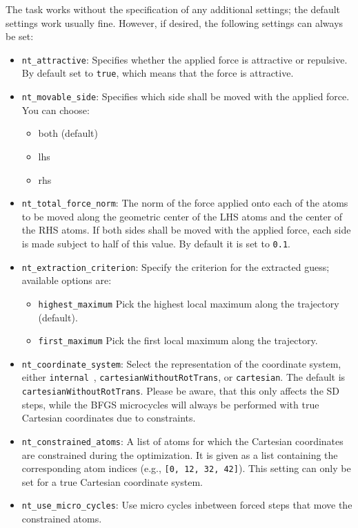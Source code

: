 \documentclass[]{tufte-book}
\begin{document}
The task works without the specification of any additional settings; the default settings work usually fine. However,
if desired, the following settings can always be set:
\begin{itemize}
\item \texttt{nt\_attractive}: Specifies whether the applied force is attractive or repulsive. By default set to
\texttt{true}, which means that the force is attractive.
\item \texttt{nt\_movable\_side}: Specifies which side shall be moved with the applied force. You can choose:
\begin{itemize}
\item both (default)
\item lhs
\item rhs
\end{itemize}
\item \texttt{nt\_total\_force\_norm}: The norm of the force applied onto each of the atoms to be moved along the geometric center of the LHS atoms and the center of the RHS atoms.
If both sides shall be moved with the applied force, each side is made subject to half of this value.
By default it is set to \texttt{0.1}.
\item \texttt{nt\_extraction\_criterion}: Specify the criterion for the extracted guess; available options are:
\begin{itemize}
  \item \texttt{highest\_maximum} Pick the highest local maximum along the trajectory (default).
  \item \texttt{first\_maximum} Pick the first local maximum along the trajectory.
\end{itemize}
\item \texttt{nt\_coordinate\_system}: Select the representation of the coordinate system, either
 \texttt{internal}~\cite{libirc}, \texttt{cartesianWithoutRotTrans}, or \texttt{cartesian}. The default is \texttt{cartesianWithoutRotTrans}.
Please be aware, that this only affects the SD steps, while the BFGS microcycles will always be performed with true
 Cartesian coordinates due to constraints.
\item \texttt{nt\_constrained\_atoms}: A list of atoms for which the Cartesian coordinates are constrained during the optimization.
  It is given as a list containing the corresponding atom indices (e.g., \texttt{[0, 12, 32, 42]}). This setting can only be set for a true Cartesian coordinate system.
\item \texttt{nt\_use\_micro\_cycles}: Use micro cycles inbetween forced steps that move the constrained atoms.

\end{itemize}
\end{document}
